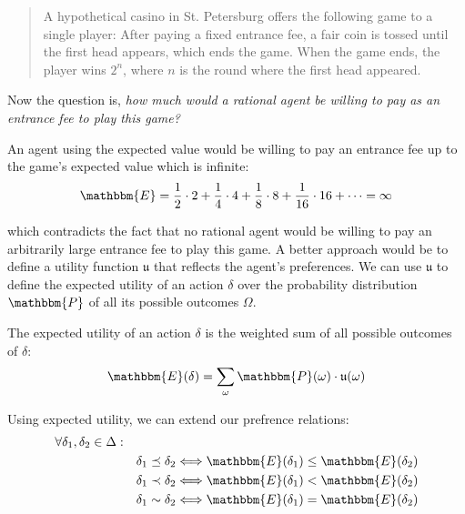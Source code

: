 \begin{quotation}
    A hypothetical casino in St. Petersburg offers the following game to a single player:
    After paying a fixed entrance fee, a fair coin is tossed until the first head appears, which ends the game. When the game ends, the player wins $2^n$, where $n$ is the round where the first head appeared.
\end{quotation}

Now the question is, \textit{how much would a rational agent be willing to pay as an entrance fee to play this game?}

An agent using the expected value would be willing to pay an entrance fee up to the game's expected value which is infinite:
$$  \mathbbm{E} = \frac{1}{2} \cdot 2 + \frac{1}{4} \cdot 4 + \frac{1}{8} \cdot 8 + \frac{1}{16} \cdot 16 + \dots = \infty$$

which contradicts the fact that no rational agent would be willing to pay an arbitrarily large entrance fee to play this game. A better approach would be to define a utility function $\mathfrak{u}$ that reflects the agent's preferences. We can use $\mathfrak{u}$ to define the expected utility of an action $\delta$ over the probability distribution $\mathbbm{P}$ of all its possible outcomes $\Omega$.

\begin{Tdef}
    The expected utility of an action $\delta$ is the weighted sum of all possible outcomes of $\delta$:
    $$\mathbbm{E}(\delta) = \sum_{\omega} \mathbbm{P}(\omega) \cdot \mathfrak{u}(\omega)$$
\end{Tdef}

Using expected utility, we can extend our prefrence relations:
\vspace{-0.5em}
\begin{subequations}
    \begin{align*}
    \forall \delta_1, \delta_2 \in \Delta: \quad& \\
    & \delta_1 \preceq \delta_2 \Longleftrightarrow \mathbbm{E}(\delta_1) \leq \mathbbm{E}(\delta_2) \\
    & \delta_1 \prec \delta_2 \Longleftrightarrow \mathbbm{E}(\delta_1) < \mathbbm{E}(\delta_2) \\
    & \delta_1 \sim \delta_2 \Longleftrightarrow \mathbbm{E}(\delta_1) = \mathbbm{E}(\delta_2) \\
    \end{align*}
\end{subequations}

